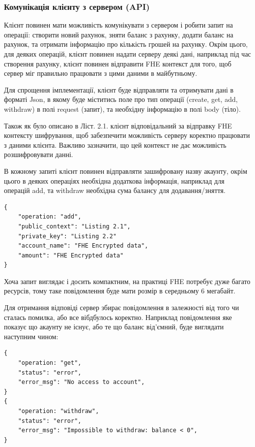 \subsubsection*{Комунікація клієнту з сервером (API)}
Клієнт повинен мати можливість комунікувати з сервером і робити запит на операції: створити
новий рахунок, зняти баланс з рахунку, додати баланс на рахунок, та отримати інформацію
про кількість грошей на рахунку. Окрім цього, для деяких операцій, клієнт повинен надати
серверу деякі дані, наприклад під час створення рахунку, клієнт повинен відправити FHE контекст
для того, щоб сервер міг правильно працювати з цими даними в майбутньому.

Для спрощення імплементації, клієнт буде відправляти та отримувати дані в форматі Json, в
якому буде міститись поле про тип операції (create, get, add, withdraw) в полі 
request (запит), та необхідну інформацію в полі body (тіло).

Також як було описано в Ліст. 2.1. клієнт відповідальний за відправку FHE контексту шифрування,
щоб забезпечити можливість серверу коректно працювати з даними клієнта. Важливо зазначити, що
цей контекст не дає можливість розшифровувати данні.

В кожному запиті клієнт повинен відправляти зашифровану назву акаунту, окрім цього в деяких
операціях необхідна додаткова інформація, наприклад для операцій add, та withdraw 
необхідна сума балансу для додавання/зняття.

\begin{lstlisting}[breaklines, caption={Json формат запиту клієнта до сервера}, captionpos=b]
{
    "operation: "add",
    "public_context": "Listing 2.1",
    "private_key": "Listing 2.2"
    "account_name": "FHE Encrypted data",
    "amount": "FHE Encrypted data"
}
\end{lstlisting}
Хоча запит виглядає і досить компактним, на практиці FHE потребує дуже багато ресурсів,
тому таке повідомлення буде мати розмір в середньому 6 мегабайт.

Для отримання відповіді сервер збирає повідомлення в залежності від того чи сталась помилка,
або все вібдбулось коректно. Наприклад повідомлення яке показує що акаунту не існує, або
те що баланс від'ємний, буде виглядати наступним чином:

\begin{lstlisting}[breaklines, caption={Json формат помилки клієнту від сервера}, captionpos=b]
{
    "operation: "get",
    "status": "error",
    "error_msg": "No access to account",
}
{
    "operation: "withdraw",
    "status": "error",
    "error_msg": "Impossible to withdraw: balance < 0",
}
\end{lstlisting}


